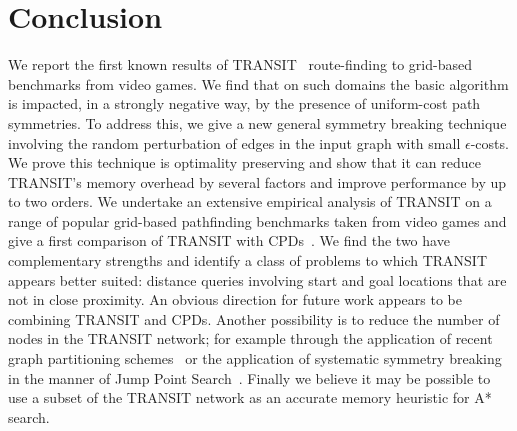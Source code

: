 \section{Conclusion}
\label{sec:conclusion}
We report the first known results of TRANSIT~\cite{bast06} route-finding to grid-based benchmarks
from video games.  We find that on such domains the basic algorithm is impacted, in a strongly
negative way, by the presence of uniform-cost path symmetries.  To address this, we give a new
general symmetry breaking technique involving the random perturbation of edges in the input graph
with small $\epsilon$-costs. We prove this technique is optimality preserving and show that it can
reduce TRANSIT's memory overhead by several factors and improve performance by up to two orders.  We
undertake an extensive empirical analysis of TRANSIT on a range of popular grid-based pathfinding
benchmarks taken from video games and give a first comparison of TRANSIT with CPDs~\cite{botea11}.
We find the two have complementary strengths and identify a class of problems to which TRANSIT
appears better suited: distance queries involving start and goal locations that are not in close
proximity.
An obvious direction for future work appears to be combining TRANSIT and CPDs.  Another possibility
is to reduce the number of nodes in the TRANSIT network; for example through the application of
recent graph partitioning schemes~\cite{natural_cuts} or the application of systematic symmetry
breaking in the manner of Jump Point Search~\cite{harabor11b}.  Finally we believe it may be
possible to use a subset of the TRANSIT network as an accurate memory heuristic for A* search.

